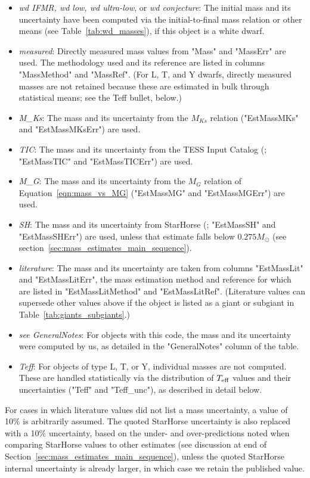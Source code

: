 \documentclass[twocolumn,tighten,twocolappendix]{aastex631}
\begin{document}
\begin{itemize}
    \item {\it wd IFMR, wd low, wd ultra-low}, or {\it wd conjecture}: The initial mass and its uncertainty have been computed via the initial-to-final mass relation or other means (see Table~\ref{tab:wd_masses}), if this object is a white dwarf.
    \item {\it measured}: Directly measured mass values from "Mass" and "MassErr" are used. The methodology used and its reference are listed in columns "MassMethod" and "MassRef". (For L, T, and Y dwarfs, directly measured masses are not retained because these are estimated in bulk through statistical means; see the Teff bullet, below.)
    \item {\it M\_Ks}: The mass and its uncertainty from the \cite{mann2019} $M_{Ks}$ relation ("EstMassMKs" and "EstMassMKsErr") are used. 
    \item {\it TIC}: The mass and its uncertainty from the TESS Input Catalog (\citealt{stassun2019}; "EstMassTIC" and "EstMassTICErr") are used.
    \item {\it M\_G}: The mass and its uncertainty from the $M_G$ relation of Equation~\ref{eqn:mass_vs_MG} ("EstMassMG" and "EstMassMGErr") are used.
    \item {\it SH}: The mass and its uncertainty from StarHorse (\citealt{anders2022}; "EstMassSH" and "EstMassSHErr") are used, unless that estimate falls below $0.275 M_\odot$ (see section~\ref{sec:mass_estimates_main_sequence}).
    \item {\it literature}: The mass and its uncertainty are taken from columns "EstMassLit" and "EstMassLitErr", the mass estimation method and reference for which are listed in "EstMassLitMethod" and "EstMassLitRef". (Literature values can supersede other values above if the object is listed as a giant or subgiant in Table~\ref{tab:giants_subgiants}.)
    \item {\it see GeneralNotes}: For objects with this code, the mass and its uncertainty were computed by us, as detailed in the "GeneralNotes" column of the table.
    \item {\it Teff}: For objects of type L, T, or Y, individual masses are not computed. These are handled statistically via the distribution of $T_{\rm eff}$ values and their uncertainties ("Teff" and "Teff\_unc"), as described in detail below.
\end{itemize}

For cases in which literature values did not list a mass uncertainty, a value of 10\% is  arbitrarily assumed. The quoted StarHorse uncertainty is also replaced with a 10\% uncertainty, based on the under- and over-predictions noted when comparing StarHorse values to other estimates (see discussion at end of Section~\ref{sec:mass_estimates_main_sequence}), unless the quoted StarHorse internal uncertainty is already larger, in which case we retain the published value.
\end{document}
